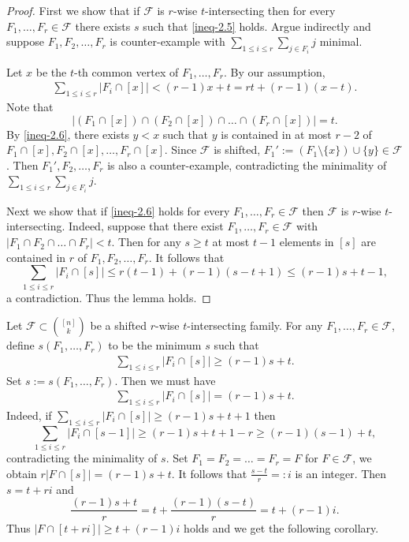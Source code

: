 \documentclass[11pt,a4paper]{article}
\newtheorem{false statement}{False statement}
\theoremstyle{definition}
\def\hf{\mathcal{F}}
\begin{document}
\begin{proof}
First we show that if $\hf$ is $r$-wise $t$-intersecting  then for every $F_1,\ldots,F_r\in \hf$ there exists $s$ such that \eqref{ineq-2.5} holds.
Argue indirectly and suppose $F_1,F_2,\ldots,F_r$ is counter-example with $\sum_{1\leq i\leq r} \sum_{j\in F_i} j$ minimal.

Let $x$ be the $t$-th common vertex of $F_1,\ldots,F_r$. By our assumption,
\begin{align}\label{ineq-2.6}
\sum_{1\leq i\leq  r}|F_i\cap [x]| <(r-1)x+t =rt+(r-1)(x-t).
\end{align}
Note that
\[
|(F_1\cap [x])\cap (F_2\cap [x])\cap \ldots \cap (F_r\cap [x])|=t.
\]
By \eqref{ineq-2.6}, there exists $y<x$ such that $y$ is contained in at most $r-2$ of $F_1\cap [x],F_2\cap [x],\ldots,F_r\cap [x]$. Since $\hf$ is shifted, $F_1':=(F_1\setminus\{x\})\cup \{y\}\in \hf$. Then $F_1',F_2,\ldots,F_r$ is also a counter-example, contradicting the minimality of $\sum_{1\leq i\leq r} \sum_{j\in F_i} j$.

Next we show that if \eqref{ineq-2.6} holds for every $F_1,\ldots,F_r\in \hf$ then $\hf$ is $r$-wise $t$-intersecting. Indeed, suppose that  there exist $F_1,\ldots,F_r\in \hf$ with $|F_1\cap F_2\cap \ldots\cap F_r|<t$. Then for any $s\geq t$ at most $t-1$ elements in $[s]$ are contained in  $r$ of $F_1,F_2,\ldots, F_r$. It follows that
\[
\sum_{1\leq i\leq r} |F_i\cap [s]| \leq r(t-1)+(r-1)(s-t+1) \leq (r-1)s+t-1,
\]
a contradiction. Thus the lemma holds.
\end{proof}

Let $\hf\subset  \binom{[n]}{k}$ be a shifted $r$-wise $t$-intersecting family.  For any $F_1,\ldots,F_r\in \hf$, define $s(F_1,\ldots,F_r)$ to be the minimum $s$ such that
\begin{align*}
\sum_{1\leq i\leq r} |F_i\cap [s]| \geq (r-1) s+t.
\end{align*}
Set $s:=s(F_1,\ldots,F_r)$. Then we must have
\begin{align*}
\sum_{1\leq i\leq r} |F_i\cap [s]| = (r-1) s+t.
\end{align*}
Indeed, if $\sum\limits_{1\leq i\leq r} |F_i\cap [s]| \geq  (r-1) s+t+1$ then
\[
\sum_{1\leq i\leq r} |F_i\cap [s-1]| \geq  (r-1) s+t+1 -r\geq (r-1)(s-1)+t,
\]
contradicting the minimality of $s$. Set $F_1=F_2=\ldots =F_r=F$ for $F\in \hf$, we obtain $r |F\cap [s]| = (r-1) s+t$.
It follows that $\frac{s-t}{r}=:i$ is an integer.  Then $s=t+ri$ and
\[
\frac{(r-1) s+t}{r}=t+\frac{(r-1)(s-t)}{r} =t+(r-1)i.
\]
Thus $|F\cap [t+ri]|\geq t+(r-1)i$ holds and  we get the following corollary.
\end{document}
